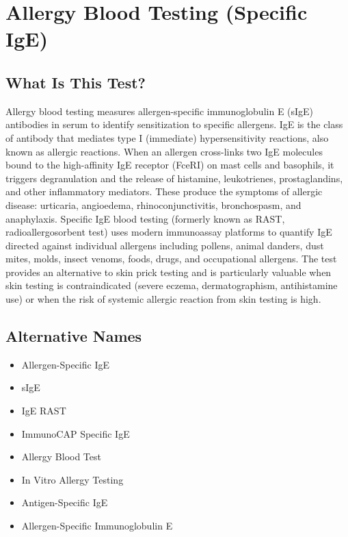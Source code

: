 \chapter{Allergy Blood Testing (Specific IgE)}

\section*{What Is This Test?}
Allergy blood testing measures allergen-specific immunoglobulin E (sIgE) antibodies in serum to identify sensitization to specific allergens. IgE is the class of antibody that mediates type I (immediate) hypersensitivity reactions, also known as allergic reactions. When an allergen cross-links two IgE molecules bound to the high-affinity IgE receptor (FceRI) on mast cells and basophils, it triggers degranulation and the release of histamine, leukotrienes, prostaglandins, and other inflammatory mediators. These produce the symptoms of allergic disease: urticaria, angioedema, rhinoconjunctivitis, bronchospasm, and anaphylaxis. Specific IgE blood testing (formerly known as RAST, radioallergosorbent test) uses modern immunoassay platforms to quantify IgE directed against individual allergens including pollens, animal danders, dust mites, molds, insect venoms, foods, drugs, and occupational allergens. The test provides an alternative to skin prick testing and is particularly valuable when skin testing is contraindicated (severe eczema, dermatographism, antihistamine use) or when the risk of systemic allergic reaction from skin testing is high.

\section*{Alternative Names}
\begin{itemize}
  \item Allergen-Specific IgE
  \item sIgE
  \item IgE RAST
  \item ImmunoCAP Specific IgE
  \item Allergy Blood Test
  \item In Vitro Allergy Testing
  \item Antigen-Specific IgE
  \item Allergen-Specific Immunoglobulin E
\end{itemize}
